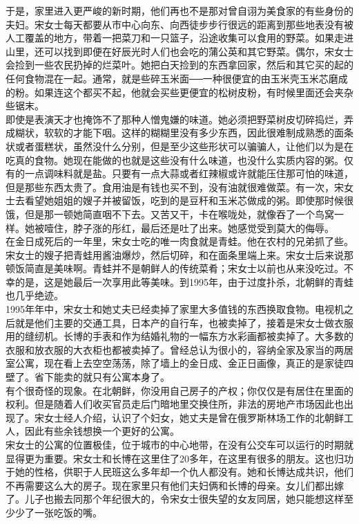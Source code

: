 \begin{multicols}{\theparacolNo}
于是，家里进入更严峻的新时期，他们再也不是那对曾自诩为美食家的有些身份的夫妇。宋女士每天都要从市中心向东、向西徒步步行很远的距离到那些地表没有被人工覆盖的地方，带着一把菜刀和一只篮子，沿途收集可以食用的野菜。如果走进山里，还可以找到即便在好辰光时人们也会吃的蒲公英和其它野菜。偶尔，宋女士会捡到一些农民扔掉的烂菜叶。她把白天捡到的东西拿回家，然后和其它买的起的任何食物混在一起。通常，就是些碎玉米面──一种很便宜的由玉米壳玉米芯磨成的粉。如果连这个都买不起，他就会买些更便宜的松树皮粉，有时候里面还会夹杂些锯末。\\

即使是表演天才也掩饰不了那种人憎鬼嫌的味道。她必须把野菜树皮切碎捣烂，弄成糊状，软软的才能下咽。这样的糊糊里没有多少东西，因此很难制成熟悉的面条状或者蛋糕状，虽然没什么分别，但是至少这些形状可以骗骗人，让他们以为是在吃真的食物。她现在能做的也就是这些没有什么味道，也没什么实质内容的粥。仅有的一点调味料就是盐。只要有一点大蒜或者红辣椒或许就能压住那可怕的味道，但是那些东西太贵了。食用油是有钱也买不到，没有油就很难做菜。有一次，宋女士去看望她姐姐的嫂子并被留饭，吃到的是豆秆和玉米芯做成的粥。即使那时候很饿，但是那一顿她简直咽不下去。又苦又干，卡在喉咙处，就像吞了一个鸟窝一样。她被噎住，脖子涨的彤红，最后还是吐了出来。她感觉受到莫大的侮辱。\\

在金日成死后的一年里，宋女士吃的唯一肉食就是青蛙。他在农村的兄弟抓了些。宋女士的嫂子把青蛙用酱油爆炒，然后切碎，和在面条里端上来。宋女士后来说那顿饭简直是美味啊。青蛙并不是朝鲜人的传统菜肴；宋女士以前也从来没吃过。不幸的是，这是她最后一次享用此等美味。到1995年，由于过度扑杀，北朝鲜的青蛙也几乎绝迹。\\

1995年年中，宋女士和她丈夫已经卖掉了家里大多值钱的东西换取食物。电视机之后就是他们主要的交通工具，日本产的自行车，也被卖掉了，接着是宋女士做衣服用的缝纫机。长博的手表和作为结婚礼物的一幅东方水彩画都被卖掉了。大多数的衣服和放衣服的大衣柜也都被卖掉了。曾经总认为很小的，容纳全家及家当的两居室公寓，现在看上去空空荡荡，除了墙上的金日成、金正日画像，真正的是家徒四壁了。省下能卖的就只有公寓本身了。\\

有个很奇怪的现象。在北朝鲜，你没用自己房子的产权；你仅仅是有居住在里面的权利。但是随着人们收买官员走后门暗地里交换住所，非法的房地产市场因此也出现了。宋女士经人介绍，认识了个妇女，她丈夫是曾在俄罗斯林场工作的北朝鲜工人，因此有些余钱想换一个更好的公寓。\\

宋女士的公寓的位置极佳，位于城市的中心地带，在没有公交车可以运行的时期就显得更为重要。宋女士和长博在这里住了20多年，在这里有很多的朋友。这也归功于她的性格，供职于人民班这么多年却一个仇人都没有。她和长博达成共识，他们不再需要这么大的房子。现在家里只有他们夫妇俩和长博的母亲。女儿们都出嫁了。儿子也搬去同那个年纪很大的，令宋女士很失望的女友同居，她只能想这样至少少了一张吃饭的嘴。\\


\end{multicols}
